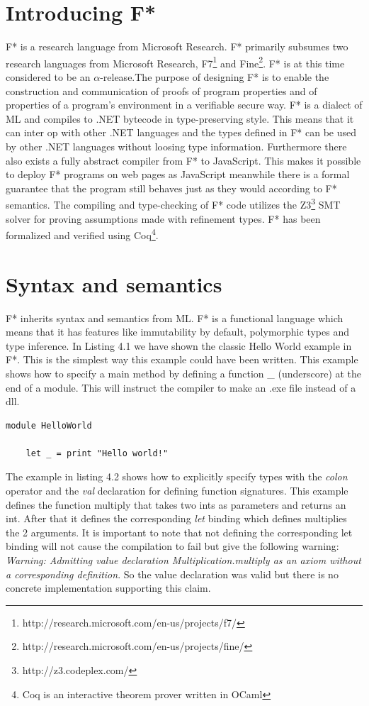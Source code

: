 \documentclass[twosided]{report}
\begin{document}
\section{Introducing F*}
F* is a research language from Microsoft Research. F* primarily subsumes two research languages from Microsoft Research, F7\footnote{http://research.microsoft.com/en-us/projects/f7/} and Fine\footnote{http://research.microsoft.com/en-us/projects/fine/}. F* is at this time considered to be an $\alpha$-release.The purpose of designing F* is to enable the construction and communication of proofs of program properties and of properties of a program's environment in a verifiable secure way. F* is a dialect of ML and compiles to .NET bytecode in type-preserving style. This means that it can inter op with other .NET languages and the types defined in F* can be used by other .NET languages without loosing type information. Furthermore there also exists a fully abstract compiler from F* to JavaScript. This makes it possible to deploy F* programs on web pages as JavaScript meanwhile there is a formal guarantee that the program still behaves just as they would according to F* semantics. The compiling and type-checking of F* code utilizes the Z3\footnote{http://z3.codeplex.com/} SMT solver for proving assumptions made with refinement types. F* has been formalized and verified using Coq\footnote{Coq is an interactive theorem prover written in OCaml}.

\section{Syntax and semantics}
F* inherits syntax and semantics from ML. F* is a functional language which means that it has features like immutability by default, polymorphic types and type inference. In Listing 4.1 we have shown the classic Hello World example in F*. This is the simplest way this example could have been written. This example shows how to specify a main method by defining a function \_ (underscore) at the end of a module. This will instruct the compiler to make an .exe file instead of a dll.

\begin{lstlisting}[style=fstar, caption={Hello World example in F*}]
	module HelloWorld
	
	let _ = print "Hello world!"
\end{lstlisting}

The example in listing 4.2 shows how to explicitly specify types with the \emph{colon} operator and the \emph{val} declaration for defining function signatures. This example defines the function multiply that takes two ints as parameters and returns an int. After that it defines the corresponding \emph{let} binding which defines multiplies the 2 arguments. It is important to note that not defining the corresponding let binding will not cause the compilation to fail but give the following warning: \emph{Warning: Admitting value declaration Multiplication.multiply as an axiom without a corresponding definition}. So the value declaration was valid but there is no concrete implementation supporting this claim.
\end{document}
